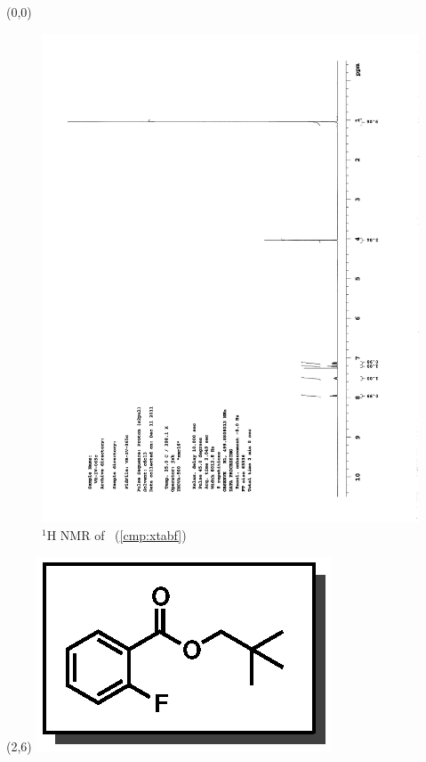 \begin{textblock}{20}(0,0)
\begin{figure}[htb]
\caption{$^1$H NMR of \CMPxtabf\ (\ref{cmp:xtabf})}
\includegraphics[scale=0.75, trim = 0mm 0mm 0mm 5mm,
clip]{chp_asymmetric/images/nmr/xtabfH}
\vspace{-100pt}
\end{figure}
\end{textblock}
\begin{textblock}{1}(2,6)
\includegraphics[scale=0.8, angle=90]{chp_asymmetric/images/xtabf}
\end{textblock}
